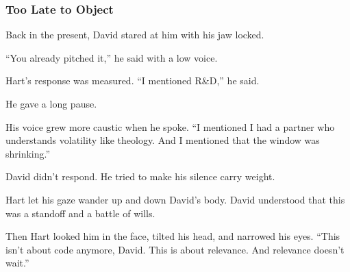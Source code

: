 \medskip

\subsubsection{Too Late to Object}

Back in the present, David stared at him with his jaw locked. 

``You already pitched it,'' he said with a low voice.

Hart’s response was measured. “I mentioned R\&D,” he said. 

He gave a long pause. 

His voice grew more caustic when he spoke. ``I mentioned I had a partner who understands volatility like theology. 
And I mentioned that the window was shrinking.''

David didn’t respond. He tried to make his silence carry weight.

Hart let his gaze wander up and down David's body. 
David understood that this was a standoff and a battle of wills. 

Then Hart looked him in the face, 
tilted his head, and narrowed his eyes. 
``This isn’t about code anymore, David.  This is about relevance. And relevance doesn’t wait.''

